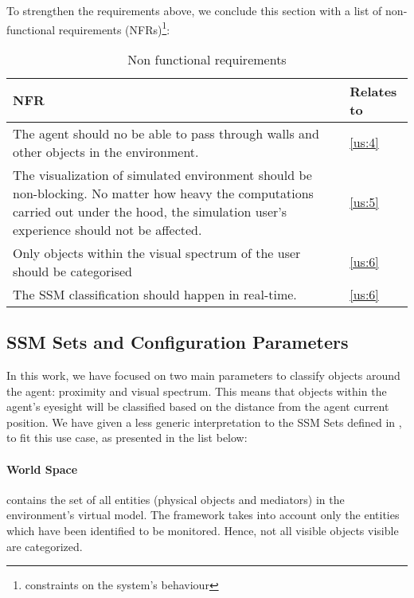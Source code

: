 To strengthen the requirements above, we conclude this section with a list of non-functional requirements (NFRs)\footnote{constraints on the system's behaviour}:
\begin{table}[H]
	\begin{center}
		\small \begin{tabular*}{1.1\columnwidth}{p{10cm}p{1.5cm}} 
			\\ \hline \hline
			NFR & Relates to \\ \hline \hline

		 	The agent should no be able to pass through walls and other objects in the environment. & \ref{us:4}\\ \hline

		 	The visualization of simulated environment should be non-blocking. No matter how heavy the computations carried out under the hood, the simulation user's experience should not be affected. & \ref{us:5}\\ \hline

		 	Only objects within the visual spectrum of the user should be categorised & \ref{us:6}\\ \hline

		 	The SSM classification should happen in real-time. & \ref{us:6}\\ \hline

		\end{tabular*}
		
		\caption{Non functional requirements}
		\label{table:nfr}
	\end{center}
\end{table}

\subsection{SSM Sets and Configuration Parameters}\label{subsec:ssm_params}
In this work, we have focused on two main parameters to classify objects around the agent: proximity and visual spectrum. This means that objects within the agent's eyesight will be classified based on the distance from the agent current position. We have given a less generic interpretation to the SSM Sets defined in \cite{pederson2011situative}, to fit this use case, as presented in the list below:
\paragraph{World Space} contains the set of all entities (physical objects and mediators) in the environment's virtual model. The framework takes into account only the entities which have been identified to be monitored. Hence, not all visible objects visible are categorized.
